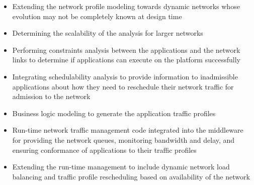 \begin{itemize}
\item Extending the network profile modeling towards dynamic networks whose evolution may not be completely known at design time
\item Determining the scalability of the analysis for larger networks
\item Performing constraints analysis between the applications and the network links to determine if applications can execute on the platform successfully
\item Integrating schedulability analysis to provide information to inadmissible applications about how they need to reschedule their network traffic for admission to the network
\item Business logic modeling to generate the application traffic profiles
\item Run-time network traffic management code integrated into the middleware for providing the network queues, monitoring bandwidth and delay, and ensuring conformance of applications to their traffic profiles
\item Extending the run-time management to include dynamic network load balancing and traffic profile rescheduling based on availability of the network
\end{itemize}
